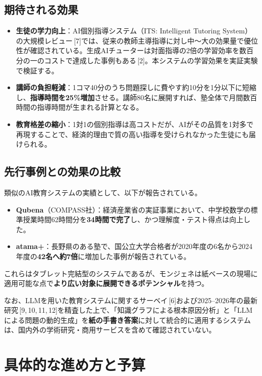 \documentclass[paper=a4,fontsize=10.5bp,jafontsize=10.5bp,twocolumn]{jlreq}
\begin{document}
\subsection{期待される効果}

\begin{itemize}
  \item \textbf{生徒の学力向上}：AI個別指導システム（ITS: Intelligent Tutoring System）の大規模レビュー\,[7]では、従来の教師主導指導に対し中〜大の効果量で優位性が確認されている。生成AIチューターは対面指導の2倍の学習効率を数百分の一のコストで達成した事例もある\,[2]。本システムの学習効果を実証実験で検証する。
  \item \textbf{講師の負担軽減}：1コマ40分のうち問題探しに費やす約10分を1分以下に短縮し、\textbf{指導時間を25\%増加}させる。講師80名に展開すれば、塾全体で月間数百時間の指導時間が生まれる計算となる。
  \item \textbf{教育格差の縮小}：1対1の個別指導は高コストだが、AIがその品質を1対多で再現することで、経済的理由で質の高い指導を受けられなかった生徒にも届けられる。
\end{itemize}

\subsection{先行事例との効果の比較}

類似のAI教育システムの実績として、以下が報告されている。
\begin{itemize}
  \item \textbf{Qubena}（COMPASS社）：経済産業省の実証事業において、中学校数学の標準授業時間62時間分を\textbf{34時間で完了}し、かつ理解度・テスト得点は向上した。
  \item \textbf{atama+}：長野県のある塾で、国公立大学合格者が2020年度の6名から2024年度の\textbf{42名へ約7倍}に増加した事例が報告されている。
\end{itemize}

これらはタブレット完結型のシステムであるが、モンジェネは紙ベースの現場に適用可能な点で\textbf{より広い対象に展開できるポテンシャル}を持つ。

なお、LLMを用いた教育システムに関するサーベイ\,[6]および2025--2026年の最新研究\,[9,\,10,\,11,\,12]を精査した上で、「知識グラフによる根本原因分析」と「LLMによる問題の動的生成」を\textbf{紙の手書き答案}に対して統合的に適用するシステムは、国内外の学術研究・商用サービスを含めて確認されていない。

\section{具体的な進め方と予算}
\end{document}
